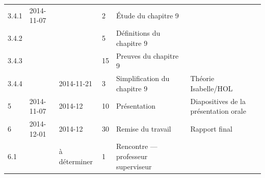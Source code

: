 \documentclass[a4paper, oneside, 12pt, titlepage]{article}
\begin{document}
\begin{landscape}
\begin{table}[!h]
\begin{tabular}{|l||l|l|p{2cm}||l|l|}
    \hline
    3.4.1 & 2014-11-07 &            & 2 & Étude du chapitre 9 & \\
    3.4.2 &            &            & 5 & Définitions du chapitre 9 & \\
    3.4.3 &            &            & 15 & Preuves du chapitre 9 & \\
    3.4.4 &            & 2014-11-21 & 3 & Simplification du chapitre 9 & Théorie Isabelle/HOL \\
    \hline
    5 & 2014-11-07 & 2014-12 & 10 & Présentation & Diapositives de la présentation orale \\
    \hline
    6   & 2014-12-01 & 2014-12      & 30 & Remise du travail & Rapport final \\
    6.1 &            & à déterminer & 1 & Rencontre --- professeur superviseur & \\
    \hline
  \end{tabular}
\end{table}

\end{landscape}
\restoregeometry
\end{document}
